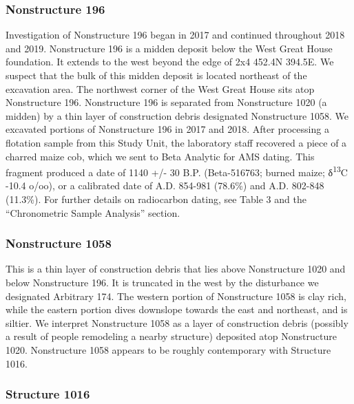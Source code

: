 \documentclass[
  12pt,
]{krantz}
\begin{document}
\hypertarget{nonstructure-196}{%
\subsubsection{Nonstructure 196}\label{nonstructure-196}}

Investigation of Nonstructure 196 began in 2017 and continued throughout
2018 and 2019. Nonstructure 196 is a midden deposit below the West Great
House foundation. It extends to the west beyond the edge of 2x4 452.4N
394.5E. We suspect that the bulk of this midden deposit is located
northeast of the excavation area. The northwest corner of the West Great
House sits atop Nonstructure 196. Nonstructure 196 is separated from
Nonstructure 1020 (a midden) by a thin layer of construction debris
designated Nonstructure 1058. We excavated portions of Nonstructure 196
in 2017 and 2018. After processing a flotation sample from this Study
Unit, the laboratory staff recovered a piece of a charred maize cob,
which we sent to Beta Analytic for AMS dating. This fragment produced a
date of 1140 +/- 30 B.P. (Beta-516763; burned maize; δ\textsuperscript{13}C -10.4 o/oo),
or a calibrated date of A.D. 854-981 (78.6\%) and A.D. 802-848 (11.3\%).
For further details on radiocarbon dating, see Table 3 and the
``Chronometric Sample Analysis'' section.

\hypertarget{nonstructure-1058}{%
\subsubsection{Nonstructure 1058}\label{nonstructure-1058}}

This is a thin layer of construction debris that lies above Nonstructure
1020 and below Nonstructure 196. It is truncated in the west by the
disturbance we designated Arbitrary 174. The western portion of
Nonstructure 1058 is clay rich, while the eastern portion dives
downslope towards the east and northeast, and is siltier. We interpret
Nonstructure 1058 as a layer of construction debris (possibly a result
of people remodeling a nearby structure) deposited atop Nonstructure
1020. Nonstructure 1058 appears to be roughly contemporary with
Structure 1016.

\hypertarget{structure-1016}{%
\subsubsection{Structure 1016}\label{structure-1016}}
\end{document}
